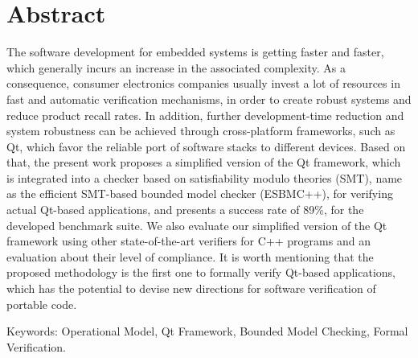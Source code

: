 \chapter*{Abstract}
\thispagestyle{empty}


The software development for embedded systems is getting faster and faster, which generally incurs an increase in the associated complexity. As a consequence, consumer electronics companies usually invest a lot of resources in fast and automatic verification mechanisms, in order to create robust systems and reduce product recall rates. In addition, further development-time reduction and system robustness can be achieved through cross-platform frameworks, such as Qt, which favor the reliable port of software stacks to different devices. Based on that, the present work proposes a simplified version of the Qt framework, which is integrated into a checker based on satisfiability modulo theories (SMT), name as the efficient SMT-based bounded model checker (ESBMC++), for verifying actual Qt-based applications, and presents a success rate of 89\%, for the developed benchmark suite. We also evaluate our simplified version of the Qt framework using other state-of-the-art verifiers for C++ programs and an evaluation about their level of compliance. It is worth mentioning that the proposed methodology is the first one to formally verify Qt-based applications, which has the potential to devise new directions for software verification of portable code.


\noindent \textsf{Keywords:} Operational Model, Qt Framework, Bounded Model Checking, Formal Verification.


\cleardoublepage
